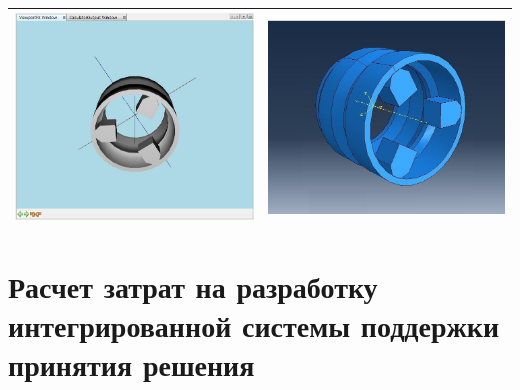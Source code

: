 \documentclass[14pt,oneside,final]{extreport}
\begin{document}
\begin{table}[]
{{\begin{tabu}[]{|c|c|}
				\includegraphics[scale=0.40]{img/loader-test3} & \includegraphics[scale=0.43]{img/loader-test3-abq} \\ 
				\hline
		\end{tabu}
		}
	}\end{table}
	
	\chapter{Расчет затрат на разработку интегрированной системы поддержки принятия решения}
\end{document}
